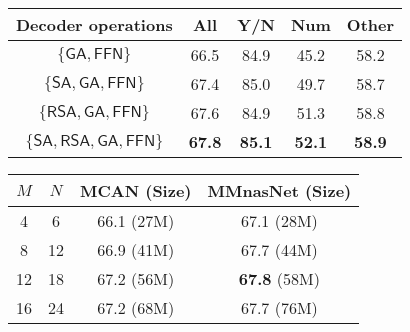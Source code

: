 \documentclass[sigconf]{acmart}
\begin{document}
\captionsetup[subtable]{font=footnotesize}
\begin{table*}
   \small
\begin{subtable}[t]{.36\textwidth}
		\centering
		\begin{tabular}{c|cccc}
            \toprule
            Decoder operations & All & Y/N& Num&Other\\
            \midrule
            $\{\mathsf{GA}, \mathsf{FFN}\}$ & 66.5 & 84.9 & 45.2 & 58.2\\
           $\{\mathsf{SA}, \mathsf{GA}, \mathsf{FFN}\}$ & 67.4 & 85.0 & 49.7 & 58.7\\
           $\{\mathsf{RSA}, \mathsf{GA}, \mathsf{FFN}\}$ & 67.6 & 84.9& 51.3 & 58.8\\
           $\{\mathsf{SA}, \mathsf{RSA}, \mathsf{GA}, \mathsf{FFN}\}$ & \textbf{67.8} & \textbf{85.1} &\textbf{52.1}& \textbf{58.9} \\
            \bottomrule
        \end{tabular}
        \vspace{5pt}
		\label{table:space}
	\end{subtable}
    \quad
    \quad
    \small
	    \begin{subtable}[t]{.3\textwidth}
		\centering
        \begin{tabular}{cc|cc}
            \toprule
            $M$ & $N$ & MCAN (Size) & MMnasNet (Size)  \\
             \midrule
            4 & 6 & 66.1 (27M) &  67.1 (28M)\\
            8 & 12 & 66.9 (41M) &  67.7 (44M)\\
            12 &18 & 67.2 (56M)& \textbf{67.8} (58M) \\
            16 & 24 & 67.2 (68M) & 67.7 (76M) \\
            \bottomrule
        \end{tabular}
        \vspace{5pt}
    \label{table:depth}
	\end{subtable}
\quad
\quad
    \small
	\begin{subtable}[t]{.265\textwidth}
		\centering
        \begin{tabular}{cc|c}

\end{tabular}
\end{subtable}
\end{table*}
\end{document}
